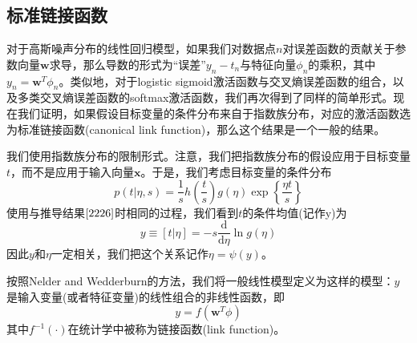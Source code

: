 \subsection*{标准链接函数}
对于高斯噪声分布的线性回归模型，如果我们对数据点$n$对误差函数的贡献关于参数向量$\boldsymbol{w}$求导，那么导数的形式为“误差”$y_n-t_n$与特征向量$\phi_n$的乘积，其中$y_n=\boldsymbol{w}^T\phi_n$。类似地，对于logistic sigmoid激活函数与交叉熵误差函数的组合，以及多类交叉熵误差函数的softmax激活函数，我们再次得到了同样的简单形式。现在我们证明，如果假设目标变量的条件分布来自于指数族分布，对应的激活函数选为标准链接函数(canonical link function)，那么这个结果是一个一般的结果。

我们使用指数族分布的限制形式。注意，我们把指数族分布的假设应用于目标变量$t$，而不是应用于输入向量$\boldsymbol{x}$。于是，我们考虑目标变量的条件分布
\begin{equation}
	p(t|\eta,s)=\frac{1}{s}h\left(\frac{t}{s} \right)g(\eta)\exp\left\{\frac{\eta t}{s} \right\}
\end{equation}
使用与推导结果$\ref{2226}$时相同的过程，我们看到$t$的条件均值(记作y)为
\begin{equation}
	y\equiv [t|\eta]=-s\frac{\mathrm{d}}{\mathrm{d} \eta}\ln g(\eta)
\end{equation}
因此$y$和$\eta$一定相关，我们把这个关系记作$\eta =\psi (y)$。

按照Nelder and Wedderburn的方法，我们将一般线性模型定义为这样的模型：$y$是输入变量(或者特征变量)的线性组合的非线性函数，即
\begin{equation}
	y=f(\boldsymbol{w}^T\phi)
\end{equation}
其中$f^{-1}(\cdot)$在统计学中被称为链接函数(link function)。

